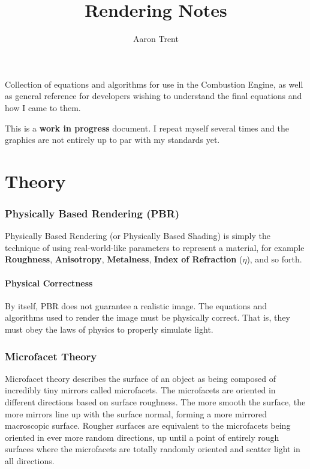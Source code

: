 \documentclass[12pt,letterpaper]{article}
\author{Aaron Trent}
\title{Rendering Notes}
\begin{document}
\maketitle

\begin{center}
\setlength{\parskip}{0.8em}

Collection of equations and algorithms for use in the Combustion Engine, 
as well as general reference for developers wishing to understand the final equations and how I came to them.

{\large This is a \textbf{work in progress} document. I repeat myself several times and the graphics are not entirely up to par with my standards yet.}
\end{center}

{\footnotesize \tableofcontents}

\setlength{\parindent}{4em}
\setlength{\parskip}{0.8em}

\newpage

\part{Theory}

\section{Physically Based Rendering (PBR)}

Physically Based Rendering (or Physically Based Shading) is simply the technique of using real-world-like parameters to represent
a material, for example \textbf{Roughness}, \textbf{Anisotropy}, \textbf{Metalness}, \textbf{Index of Refraction} ($\eta$), and so forth.

\subsection{Physical Correctness}

By itself, PBR does not guarantee a realistic image. The equations and algorithms used to render the image must be physically correct.
That is, they must obey the laws of physics to properly simulate light.

\section{Microfacet Theory}

Microfacet theory describes the surface of an object as being composed of incredibly tiny mirrors called microfacets. 
The microfacets are oriented in different directions based on surface roughness. The more smooth the surface, the more mirrors line up with the surface normal,
forming a more mirrored macroscopic surface. Rougher surfaces are equivalent to the microfacets being oriented in ever more random directions,
up until a point of entirely rough surfaces where the microfacets are totally randomly oriented and 
scatter light in all directions.
\end{document}
